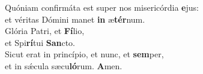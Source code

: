 \evenverse Quóniam confirmáta est super nos misericórdia \textbf{e}jus:~\*\\
\evenverse et véritas Dómini manet \textbf{in} æ\textbf{tér}num.\\
\oddverse Glória Patri, et \textbf{Fí}lio,~\*\\
\oddverse et Spi\textbf{rí}tui \textbf{San}cto.\\
\evenverse Sicut erat in princípio, et nunc, et \textbf{sem}per,~\*\\
\evenverse et in sǽcula sæcu\textbf{ló}rum. \textbf{A}men.\\
